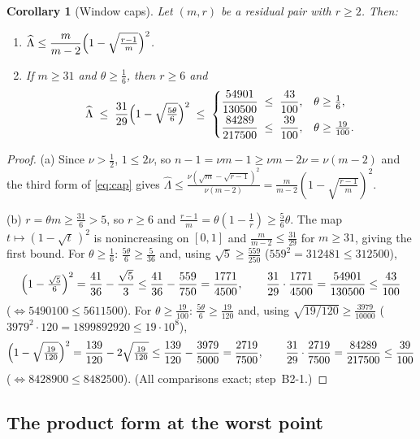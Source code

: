 \documentclass[11pt]{article}
\newtheorem{corollary}[theorem]{Corollary}
\theoremstyle{remark}
\theoremstyle{plain}
\theoremstyle{plain}
\newcommand{\Lhat}{\widehat\Lambda}
\begin{document}
\begin{corollary}[Window caps]\label{cor:capwindows}
Let $(m,r)$ be a residual pair with $r\ge2$.  Then:
\begin{enumerate}[label=\textup{(\alph*)}]
\item $\Lhat\le\dfrac{m}{m-2}\Bigl(1-\sqrt{\tfrac{r-1}{m}}\Bigr)^{2}$.
\item If $m\ge31$ and $\theta\ge\tfrac16$, then $r\ge6$ and
\[
        \Lhat\;\le\;\frac{31}{29}\Bigl(1-\sqrt{\tfrac{5\theta}6}\Bigr)^{2}
        \;\le\;
        \begin{cases}
        \dfrac{54901}{130500}\;\le\;\dfrac{43}{100}, & \theta\ge\tfrac16,\\[2mm]
        \dfrac{84289}{217500}\;\le\;\dfrac{39}{100}, & \theta\ge\tfrac{19}{100}.
        \end{cases}
\]
\end{enumerate}
\end{corollary}

\begin{proof}
(a) Since $\nu>\tfrac12$, $1\le2\nu$, so $n-1=\nu m-1\ge\nu m-2\nu=\nu(m-2)$ and the third form of \eqref{eq:cap} gives
$\Lhat\le\frac{\nu(\sqrt m-\sqrt{r-1})^2}{\nu(m-2)}=\frac{m}{m-2}(1-\sqrt{\tfrac{r-1}m})^2$.

(b) $r=\theta m\ge\tfrac{31}6>5$, so $r\ge6$ and $\frac{r-1}m=\theta(1-\tfrac1r)\ge\tfrac56\theta$.  The map $t\mapsto(1-\sqrt t\,)^2$ is nonincreasing on $[0,1]$ and $\tfrac m{m-2}\le\tfrac{31}{29}$ for $m\ge31$, giving the first bound.  For $\theta\ge\tfrac16$: $\tfrac{5\theta}6\ge\tfrac5{36}$ and, using $\sqrt5\ge\tfrac{559}{250}$ ($559^2=312481\le312500$),
\[
        \Bigl(1-\tfrac{\sqrt5}6\Bigr)^2=\frac{41}{36}-\frac{\sqrt5}{3}
        \le\frac{41}{36}-\frac{559}{750}=\frac{1771}{4500},
        \qquad
        \frac{31}{29}\cdot\frac{1771}{4500}=\frac{54901}{130500}
        \le\frac{43}{100}
\]
($\iff5490100\le5611500$).  For $\theta\ge\tfrac{19}{100}$: $\tfrac{5\theta}6\ge\tfrac{19}{120}$ and, using $\sqrt{19/120}\ge\tfrac{3979}{10000}$ ($3979^2\cdot120=1899892920\le19\cdot10^8$),
\[
        \Bigl(1-\sqrt{\tfrac{19}{120}}\Bigr)^2
        =\frac{139}{120}-2\sqrt{\tfrac{19}{120}}
        \le\frac{139}{120}-\frac{3979}{5000}=\frac{2719}{7500},
        \qquad
        \frac{31}{29}\cdot\frac{2719}{7500}=\frac{84289}{217500}
        \le\frac{39}{100}
\]
($\iff8428900\le8482500$).  (All comparisons exact; step~B2-1.)
\end{proof}

\subsection{The product form at the worst point}\label{sec:prod}
\end{document}
